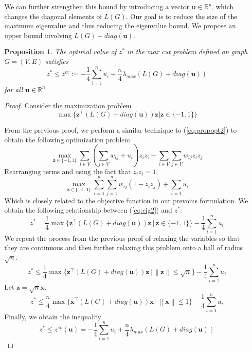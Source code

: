 \documentclass[12pt]{article}
\theoremstyle{plain}
\newtheorem{prop}{Proposition}
\theoremstyle{definition}
\newcommand{\norm}[1]{\left\lVert#1\right\rVert}
\begin{document}
We can further strengthen this bound by introducing a vector $\mathbf{u} \in \mathbb{R}^n$, which changes the diagonal elements of $L(G)$. Our goal is to reduce the size of the maximum eigenvalue and thus reducing the eigenvalue bound. We propose an upper bound involving $L(G)  + diag(\mathbf{u})$.

\begin{prop}
    The optimal value of $z^*$ in the max cut problem defined on graph $G=(V,E)$ satisfies
    \[
        z^* \leq z^{ev} := - \frac{1}{4}\sum_{i=1}^n u_i + \dfrac{n}{4} \lambda_{max}(L(G) + diag(\mathbf{u}))
    \]
    for all $\mathbf{u} \in \mathbb{R}^n$
\end{prop}

\begin{proof}
    Consider the maximization problem
    \begin{equation}\label{eq:propopt2}
        \max\lbrace \mathbf{z}^\top (L(G) + diag(\mathbf{u})) \mathbf{z} | \mathbf{z} \in \lbrace -1,1\rbrace \rbrace
    \end{equation}
   
    From the previous proof, we perform a similar technique to (\ref{eq:propopt2}) to obtain the following optimization problem 
    \[
    \max_{\mathbf{z} \in \lbrace -1,1 \rbrace} \sum_{i \in V}\left(\sum_{j \in V} w_{ij} + u_i \right) z_i z_i - \sum_{i \in V}\sum_{j \in V} w_{ij}z_i z_j
    \] 
    Rearranging terms and using the fact that $z_i z_i = 1$,
    \begin{equation}
        \max_{\mathbf{z} \in \lbrace -1, 1\rbrace} \sum_{i = 1}^n \sum_{j=1}^n w_{ij} (1 - z_i z_j) + \sum_{i = 1} u_i \label{eq:eig2}
    \end{equation}
    Which is closely related to the objective function in our prevoius formulation. We obtain the following relationship between (\ref{eq:eig2}) and $z^*$:
    \[
      z^* = \frac{1}{4} \max\lbrace \mathbf{z}^\top (L(G) + diag(\mathbf{u})) \mathbf{z} \,|\, \mathbf{z} \in \lbrace -1,1\rbrace \rbrace - \frac{1}{4}\sum_{i=1}^n u_i   
    \]
    We repeat the process from the previous proof of relaxing the variables so that they are continuous and then further relaxing this problem onto a ball of radius $\sqrt{n}$.
    \[
        z^* \leq \frac{1}{4} \max\lbrace \mathbf{z}^\top (L(G) + diag(\mathbf{u})) \mathbf{z} \,|\, \norm{\mathbf{z}} \leq \sqrt{n} \rbrace - \frac{1}{4}\sum_{i=1}^n u_i
    \]
    Let $\mathbf{z} = \sqrt{n} \mathbf{x}$. 
    \[
        z^* \leq \frac{n}{4} \max\lbrace \mathbf{x}^\top (L(G) + diag(\mathbf{u})) \mathbf{x} \,|\, \norm{\mathbf{x}} \leq 1\rbrace - \frac{1}{4}\sum_{i=1}^n u_i
    \]
    Finally, we obtain the inequality
    \begin{equation}
        z^* \leq z^{ev}(\mathbf{u}) = -\frac{1}{4}\sum_{i=1}^n u_i + \dfrac{n}{4} \lambda_{max}(L(G) + diag(\mathbf{u}))
    \end{equation}
\end{proof}
    
\end{document}
